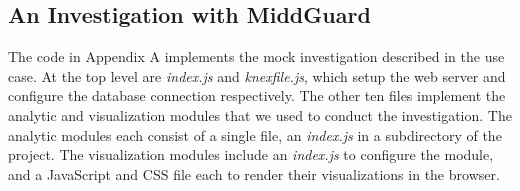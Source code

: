 \documentclass[midd]{thesis}
\begin{document}
\begin{landscape}
  \chapter{An Investigation with MiddGuard}

  \addtolength{\hoffset}{-1cm}
  \addtolength{\textheight}{1cm}

  \begin{multicols}{2}

    The code in Appendix A implements the mock investigation described in the
    use case. At the top level are \textit{index.js} and \textit{knexfile.js},
    which setup the web server and configure the database connection
    respectively. The other ten files implement the analytic and visualization
    modules that we used to conduct the investigation. The analytic modules each
    consist of a single file, an \textit{index.js} in a subdirectory of the
    project. The visualization modules include an \textit{index.js} to configure
    the module, and a JavaScript and CSS file each to render their
    visualizations in the browser.








  \end{multicols}

  \addtolength{\hoffset}{1cm}
  \addtolength{\textheight}{-1cm}
\end{landscape}
\end{document}
